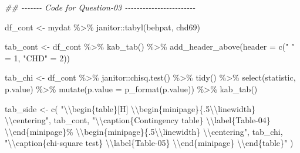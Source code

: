 \documentclass[
  12pt,
  oneside]{article}
\newenvironment{Shaded}{}{}
\newcommand{\AttributeTok}[1]{\textcolor[rgb]{0.49,0.56,0.16}{#1}}
\newcommand{\DecValTok}[1]{\textcolor[rgb]{0.25,0.63,0.44}{#1}}
\newcommand{\DocumentationTok}[1]{\textcolor[rgb]{0.73,0.13,0.13}{\textit{#1}}}
\newcommand{\FunctionTok}[1]{\textcolor[rgb]{0.02,0.16,0.49}{#1}}
\newcommand{\NormalTok}[1]{#1}
\newcommand{\OtherTok}[1]{\textcolor[rgb]{0.00,0.44,0.13}{#1}}
\newcommand{\SpecialCharTok}[1]{\textcolor[rgb]{0.25,0.44,0.63}{#1}}
\newcommand{\StringTok}[1]{\textcolor[rgb]{0.25,0.44,0.63}{#1}}
\begin{document}
\begin{Shaded}
\begin{Highlighting}[]
\DocumentationTok{\#\# {-}{-}{-}{-}{-}{-}{-} Code for Question{-}03 {-}{-}{-}{-}{-}{-}{-}{-}{-}{-}{-}{-}{-}{-}{-}{-}{-}{-}{-}{-}{-}{-}{-}{-}}

\NormalTok{df\_cont }\OtherTok{\textless{}{-}}\NormalTok{ mydat }\SpecialCharTok{\%\textgreater{}\%}\NormalTok{ janitor}\SpecialCharTok{::}\FunctionTok{tabyl}\NormalTok{(behpat, chd69)}

\NormalTok{tab\_cont }\OtherTok{\textless{}{-}}\NormalTok{ df\_cont }\SpecialCharTok{\%\textgreater{}\%}
  \FunctionTok{kab\_tab}\NormalTok{() }\SpecialCharTok{\%\textgreater{}\%}
  \FunctionTok{add\_header\_above}\NormalTok{(}\AttributeTok{header =} \FunctionTok{c}\NormalTok{(}\StringTok{" "} \OtherTok{=} \DecValTok{1}\NormalTok{, }\StringTok{"CHD"} \OtherTok{=} \DecValTok{2}\NormalTok{))}

\NormalTok{tab\_chi }\OtherTok{\textless{}{-}}\NormalTok{ df\_cont }\SpecialCharTok{\%\textgreater{}\%}
\NormalTok{  janitor}\SpecialCharTok{::}\FunctionTok{chisq.test}\NormalTok{() }\SpecialCharTok{\%\textgreater{}\%}
  \FunctionTok{tidy}\NormalTok{() }\SpecialCharTok{\%\textgreater{}\%}
  \FunctionTok{select}\NormalTok{(statistic, p.value) }\SpecialCharTok{\%\textgreater{}\%}
  \FunctionTok{mutate}\NormalTok{(}\AttributeTok{p.value =} \FunctionTok{p\_format}\NormalTok{(p.value)) }\SpecialCharTok{\%\textgreater{}\%}
  \FunctionTok{kab\_tab}\NormalTok{()}

\NormalTok{tab\_side }\OtherTok{\textless{}{-}} \FunctionTok{c}\NormalTok{(}
    \StringTok{"}\SpecialCharTok{\textbackslash{}\textbackslash{}}\StringTok{begin\{table\}[H]}
\StringTok{      }\SpecialCharTok{\textbackslash{}\textbackslash{}}\StringTok{begin\{minipage\}\{.5}\SpecialCharTok{\textbackslash{}\textbackslash{}}\StringTok{linewidth\}}
\StringTok{      }\SpecialCharTok{\textbackslash{}\textbackslash{}}\StringTok{centering"}\NormalTok{,}
\NormalTok{      tab\_cont,}
      \StringTok{"}\SpecialCharTok{\textbackslash{}\textbackslash{}}\StringTok{caption\{Contingency table\}}
\StringTok{      }\SpecialCharTok{\textbackslash{}\textbackslash{}}\StringTok{label\{Table{-}04\}}
\StringTok{    }\SpecialCharTok{\textbackslash{}\textbackslash{}}\StringTok{end\{minipage\}\%}
\StringTok{      }\SpecialCharTok{\textbackslash{}\textbackslash{}}\StringTok{begin\{minipage\}\{.5}\SpecialCharTok{\textbackslash{}\textbackslash{}}\StringTok{linewidth\}}
\StringTok{        }\SpecialCharTok{\textbackslash{}\textbackslash{}}\StringTok{centering"}\NormalTok{,}
\NormalTok{    tab\_chi,}
    \StringTok{"}\SpecialCharTok{\textbackslash{}\textbackslash{}}\StringTok{caption\{chi{-}square test\}}
\StringTok{    }\SpecialCharTok{\textbackslash{}\textbackslash{}}\StringTok{label\{Table{-}05\}}
\StringTok{    }\SpecialCharTok{\textbackslash{}\textbackslash{}}\StringTok{end\{minipage\}}
\StringTok{      }\SpecialCharTok{\textbackslash{}\textbackslash{}}\StringTok{end\{table\}"}
\NormalTok{  )}



\end{Highlighting}
\end{Shaded}
\end{document}

